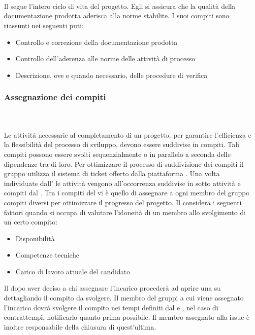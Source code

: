 \paragraph{\ver{}}\mbox{}\\
\mbox{}\\
Il \ver{} segue l'intero ciclo di vita del progetto. Egli si assicura che la qualità della documentazione prodotta aderisca alla norme stabilite.
I suoi compiti sono riassunti nei seguenti puti:
\begin{itemize}
\item Controllo e correzione della documentazione prodotta
\item Controllo dell'aderenza alle norme delle attività di processo
\item Descrizione, ove e quando necessario, delle procedure di verifica
\end{itemize}

\subsubsection{Assegnazione dei compiti}\mbox{}\\
\mbox{}\\
Le attività necessarie al completamento di un progetto, per garantire l'efficienza e la flessibilità del processo di sviluppo, devono essere suddivise in compiti. Tali compiti possono essere svolti sequenzialmente o in parallelo a seconda delle dipendenze tra di loro. Per ottimizzare il processo di suddivisione dei compiti il gruppo utilizza il sistema di ticket offerto dalla piattaforma .
Una volta individuate dall' \ana{} le attività vengono all'occorrenza suddivise in sotto attività e compiti dal \RdP{}. Tra i compiti del \RdP{} vi è quello di assegnare a ogni membro del gruppo compiti diversi per ottimizzare il progresso del progetto. Il \RdP{} considera i seguenti fattori quando si occupa di valutare l'idoneità di un membro allo svolgimento di un certo compito:
\begin{itemize}
\item Disponibilità
\item Competenze tecniche
\item Carico di lavoro attuale del candidato
\end{itemize}
Il \RdP{} dopo aver deciso a chi assegnare l'incarico procederà ad aprire una  su  dettagliando il compito da svolgere.
Il membro del gruppi a cui viene assegnato l'incarico dovrà svolgere il compito nei tempi definiti dal \RdP{} e , nel caso di contrattempi, notificarlo quanto prima possibile. Il membro assegnato alla issue è inoltre responsabile della chiusura di quest'ultima.